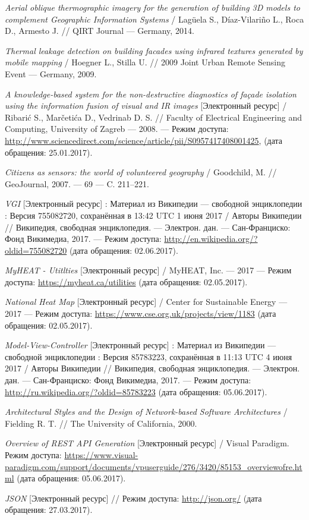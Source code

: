 \begin{thebibliography}{00}
	\emph{Aerial oblique thermographic imagery for the generation of building 3D models to complement Geographic Information Systems} /  Lagüela S., Díaz-Vilariño L., Roca D., Armesto J. //
	QIRT Journal --- Germany, 2014.

	\emph{Thermal leakage detection on building facades using infrared textures generated by mobile mapping} / Hoegner L., Stilla U. //
	2009 Joint Urban Remote Sensing Event --- Germany, 2009.

	\emph{A knowledge-based system for the non-destructive diagnostics of façade isolation using the information fusion of visual and IR images} [Электронный ресурс] / Ribarić S., Marčetića D., Vedrinab D. S. // Faculty of Electrical Engineering and Computing, University of Zagreb --- 2008. --- Режим доступа: \url{http://www.sciencedirect.com/science/article/pii/S0957417408001425}, (дата обращения: 25.01.2017).

	\emph{Citizens as sensors: the world of volunteered geography} / Goodchild, M. // GeoJournal, 2007. --- \No{} 69 --- C. 211–221.

	\emph{VGI} [Электронный ресурс] : Материал из Википедии — свободной энциклопедии : Версия 755082720, сохранённая в 13:42 UTC 1 июня 2017 / Авторы Википедии // Википедия, свободная энциклопедия. — Электрон. дан. — Сан-Франциско: Фонд Викимедиа, 2017. — Режим доступа: \url{http://en.wikipedia.org/?oldid=755082720} (дата обращения: 02.06.2017).

	\emph{MyHEAT - Utitlties} [Электронный ресурс] / MyHEAT, Inc. --- 2017 --- Режим доступа: \url{https://myheat.ca/utilities} (дата обращения: 02.05.2017).

	\emph{National Heat Map} [Электронный ресурс] / Center for Sustainable Energy --- 2017 ---  Режим доступа: \url{https://www.cse.org.uk/projects/view/1183} (дата обращения: 02.05.2017).

	\emph{Model-View-Controller} [Электронный ресурс] : Материал из Википедии — свободной энциклопедии : Версия 85783223, сохранённая в 11:13 UTC 4 июня 2017 / Авторы Википедии // Википедия, свободная энциклопедия. — Электрон. дан. — Сан-Франциско: Фонд Викимедиа, 2017. — Режим доступа: \url{http://ru.wikipedia.org/?oldid=85783223} (дата обращения: 05.06.2017).

	\emph{Architectural Styles and the Design of Network-based Software Architectures} / Fielding R. T. // The University of California, 2000.

	\emph{Overview of REST API Generation} [Электронный ресурс] / Visual Paradigm. Режим доступа: \url{https://www.visual-paradigm.com/support/documents/vpuserguide/276/3420/85153_overviewofre.html} (дата обращения: 05.06.2017).

	\emph{JSON} [Электронный ресурс] // Режим доступа: \url{http://json.org/} (дата
обращения: 27.03.2017).


\end{thebibliography}